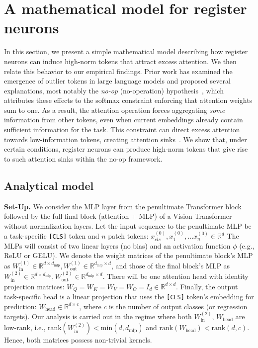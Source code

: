 \documentclass{article}
\begin{document}
\section{A mathematical model for register neurons}
\label{sec:theory}
In this section, we present a simple mathematical model describing how register neurons can induce high-norm tokens that attract excess attention. We then relate this behavior to our empirical findings. Prior work has examined the emergence of outlier tokens in large language models and proposed several explanations, most notably the \textit{no-op} (no-operation) hypothesis~\citep{clark2019does, kobayashiattention, bondarenko2023quantizable}, which attributes these effects to the softmax constraint enforcing that attention weights sum to one. As a result, the attention operation forces aggregating \textit{some} information from other tokens, even when current embeddings already contain sufficient information for the task. This constraint can direct excess attention towards low-information tokens, creating attention sinks~\citep{xiaoefficient}. We show that, under certain conditions, register neurons can produce high-norm tokens that give rise to such attention sinks within the no-op framework.

\subsection{Analytical model}
\textbf{Set-Up.}
We consider the MLP layer from the penultimate Transformer block followed by the full final block (attention + MLP) of a Vision Transformer without normalization layers. Let the input sequence to the penultimate MLP be a task-specific \texttt{[CLS]} token and $n$ patch tokens: $x^{(0)}_{cls}, x^{(0)}_1,...  x^{(0)}_n\in \mathbb{R}^{d}$ The MLPs will consist of two linear layers (no bias) and an activation function \( \phi \) (e.g., ReLU or GELU). We denote the weight matrices of the penultimate block's MLP as $W_{\text{in}}^{(1)} \in \mathbb{R}^{d \times d_{\text{mlp}}}, W_{\text{out}}^{(1)} \in \mathbb{R}^{d_{\text{mlp}} \times d}$, and those of the final block's MLP as $W_{\text{in}}^{(2)} \in \mathbb{R}^{d \times d_{\text{mlp}}}, W_{\text{out}}^{(2)} \in \mathbb{R}^{d_{\text{mlp}} \times d}$. There will be one attention head with identity projection matrices: \( W_Q = W_K = W_V = W_O = I_d \in \mathbb{R}^{d \times d} \). Finally, the output task-specific head is a linear projection that uses the \texttt{[CLS]} token's embedding for prediction: $W_{\text{head}} \in \mathbb{R}^{d \times c}$,  where \( c \) is the number of output classes (or regression targets). Our analysis is carried out in the regime where both $W_{\text{in}}^{(2)}$, $W_{\text{head}}$  are low-rank, i.e., $\mathrm{rank}(W_{\text{in}}^{(2)})< \mathrm{min}(d,d_{\text{mlp}})$ and
$\mathrm{rank}(W_{\text{head}})< \mathrm{rank}(d,c)$. Hence, both matrices possess non-trivial kernels. 
\end{document}
